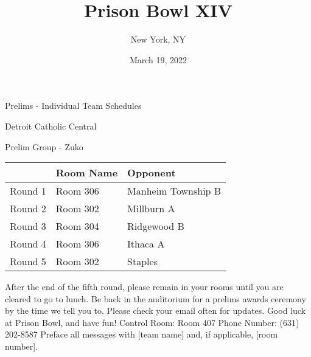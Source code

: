 \documentclass{article}%
\title{Prison Bowl XIV}%
\author{New York, NY}%
\date{March 19, 2022}%
\begin{document}
%
\normalsize%
%
\maketitle%
\vspace*{48pt}%
\begin{center}%
\begin{Huge}%
Prelims {-} Individual Team Schedules%
\end{Huge}%
\end{center}%
\newpage%
\pagestyle{fancy}%
\fancyhf{}%
%
%
%
%
\begin{center}%
\begin{Huge}%
Detroit Catholic Central%
\end{Huge}%
\vspace*{12pt}%
\linebreak%
\begin{Large}%
Prelim Group {-} Zuko%
\end{Large}%
\end{center}%
\vspace*{4pt}%
\begin{tabularx}{\textwidth}{|c|Y|Y|}%
\hline%
&Room Name&Opponent\\%
\hline%
Round 1&Room 306&Manheim Township B\\%
Round 2&Room 302&Millburn A\\%
Round 3&Room 304&Ridgewood B\\%
Round 4&Room 306&Ithaca A\\%
Round 5&Room 302&Staples\\%
\hline%
\end{tabularx}%
\vspace*{30pt}%
\linebreak%
After the end of the fifth round, please remain in your rooms until you are cleared to go to lunch. Be back in the auditorium for a prelims awards ceremony by the time we tell you to. Please check your email often for updates. Good luck at Prison Bowl, and have fun!\newline%
\newline%
Control Room: Room 407\newline%
Phone Number: (631) 202{-}8587\newline%
Preface all messages with {[}team name{]} and, if applicable, {[}room number{]}.%
\vspace*{30pt}%
\end{document}
